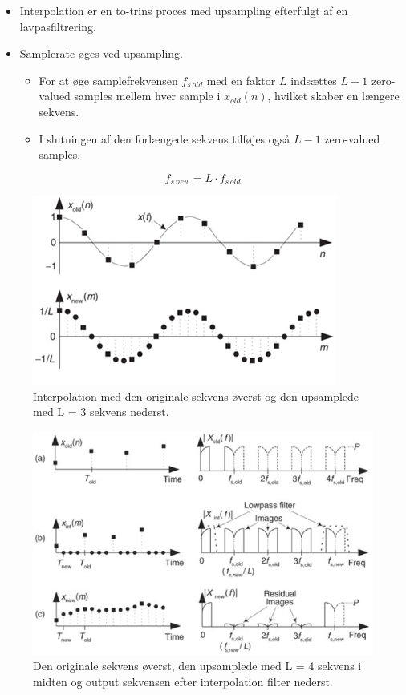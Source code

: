 \documentclass[danish]{article}
\begin{document}
\begin{itemize}
	\item Interpolation er en to-trins proces med upsampling efterfulgt af en lavpasfiltrering.
	\item Samplerate øges ved upsampling.
	\begin{itemize}
		\item 	For at øge samplefrekvensen $f_{s\, old}$ med en faktor $L$ indsættes $L-1$ zero-valued samples mellem hver sample i $x_{old}(n)$, hvilket skaber en længere sekvens. 
		\item I slutningen af den forlængede sekvens tilføjes også $L-1$ zero-valued samples.
	\end{itemize}
\end{itemize}

\begin{equation}
f_{s\, new} = L \cdot f_{s\, old}
\end{equation}

\begin{figure}[H]
	\centering
	\includegraphics[width=0.6\linewidth]{graphics/interpolation}
	\caption{Interpolation med den originale sekvens øverst og den upsamplede med L = 3 sekvens nederst.}
	\label{fig:interpolation}
\end{figure}

\begin{figure}[H]
	\centering
	\includegraphics[width=0.6\linewidth]{graphics/interpolation1}
	\caption{Den originale sekvens øverst, den upsamplede med L = 4 sekvens i midten og output sekvensen efter interpolation filter nederst.}
	\label{fig:interpolation1}
\end{figure}
\end{document}

